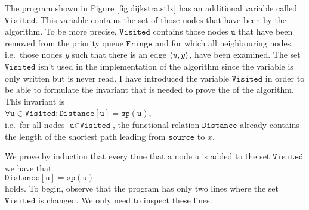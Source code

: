 The program shown in Figure \ref{fig:dijkstra.stlx} has an additional variable called $\texttt{Visited}$.
This variable contains the set of those nodes that have been   by the algorithm.
To be more precise, $\texttt{Visited}$ contains those nodes $\texttt{u}$ that have been removed from the
priority queue $\texttt{Fringe}$ and for which all neighbouring nodes, i.e.~those nodes $y$ such that
there is an edge $\pair(u,y)$, have been examined.
The set $\texttt{Visited}$ isn't used in the implementation of the algorithm since the variable is
only written but is never read.
I have introduced the variable $\texttt{Visited}$ in order to be able to formulate the invariant that
is needed to prove the  of the algorithm.  This invariant is
\\[0.2cm]
\hspace*{1.3cm}
$\forall \texttt{u}\in\texttt{Visited}: \texttt{Distance}[\texttt{u}] = \texttt{sp}(\texttt{u})$,
\\[0.2cm]
i.e.~for all nodes $\texttt{u} \in \texttt{Visited}$, the functional relation $\texttt{Distance}$
already contains the length of the shortest path leading from $\texttt{source}$ to $x$.  
\vspace*{0.1cm}

\proof 
We prove by induction that every time that a node $\texttt{u}$ is added to the set
$\texttt{Visited}$ we have that
\\[0.2cm]
\hspace*{1.3cm}
$\texttt{Distance}[\texttt{u}] = \texttt{sp}(\texttt{u})$ 
\\[0.2cm]
holds.  To begin, observe that the program has only two lines where the set $\texttt{Visited}$ is changed.
We only need to inspect these lines.

